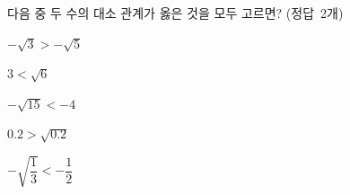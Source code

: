 다음 중 두 수의 대소 관계가 옳은 것을 모두 고르면? \mbox{(정답 2개)}
\begin{choices32}{\rule[-3ex]{0pt}{8ex}$-\sqrt{3}>-\sqrt{5}$}{\rule[-3ex]{0pt}{8ex}$3<\sqrt{6}$}{\rule[-3ex]{0pt}{8ex}$-\sqrt{15}<-4$}{\rule[-3ex]{0pt}{8ex}$0.2>\sqrt{0.2}$}{\rule[-3ex]{0pt}{8ex}$-\sqrt{\dfrac{1}{3}}<-\dfrac{1}{2}$}\end{choices32}
